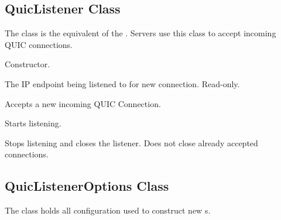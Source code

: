 \subsection{QuicListener Class}

The  class is the equivalent of the . Servers use this
class to accept incoming QUIC connections.

\begin{description}

     Constructor.

     The IP endpoint being listened to for new connection. Read-only.

    Accepts a new incoming QUIC Connection.

     Starts listening.

     Stops listening and closes the listener. Does not close already accepted connections.

\end{description}

\subsection{QuicListenerOptions Class}

The  class holds all configuration used to construct new s.

